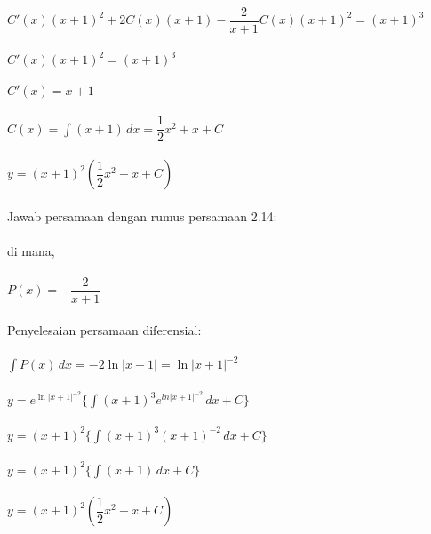 \begin{enumerate}[1.]
	\begin{math} C'(x)(x + 1)^{2} + 2C(x)(x + 1) - \dfrac{2}{x + 1}C(x)(x + 1)^{2} = (x + 1)^{3} \end{math} \\ \\
	\begin{math} C'(x)(x + 1)^{2} = (x+1)^{3} \end{math} \\ \\
	\begin{math} C'(x) = x + 1 \end{math} \\ \\
	\begin{math} C(x) = \int (x + 1) \, dx = \dfrac{1}{2}x^{2} + x + C \end{math} \\ \\
	\begin{math} y = (x + 1)^{2}(\dfrac{1}{2}x^{2} + x + C) \end{math} \\ \\
	Jawab persamaan dengan rumus persamaan 2.14: \\ \\
	di mana, \\ \\
	\begin{math} P(x) = -\dfrac{2}{x + 1} \end{math} \\ \\
	Penyelesaian persamaan diferensial: \\ \\
	\begin{math} \int P(x) \, dx = -2\ln|x + 1| = \ln |x + 1|^{-2} \end{math} \\ \\
	\begin{math} y = e^{\ln |x + 1|^{-2}} \bigg\{ \int (x + 1)^{3} e^{ ln|x + 1|^{-2}} \, dx + C \bigg\} \end{math} \\ \\
	\begin{math} y = (x + 1)^{2} \bigg\{ \int (x + 1)^{3}(x + 1)^{-2} \, dx + C \bigg\} \end{math} \\ \\
	\begin{math} y = (x + 1)^{2} \bigg\{ \int (x + 1) \, dx + C \bigg\} \end{math} \\ \\
	\begin{math} y = (x + 1)^{2} (\dfrac{1}{2}x^{2} + x + C) \end{math} 
	

\end{enumerate}
